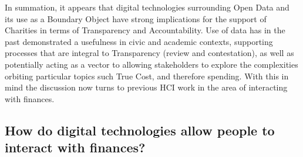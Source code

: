 In summation, it appears that digital technologies surrounding Open Data and its use as a Boundary Object have strong implications for the support of Charities in terms of Transparency and Accountability. Use of data has in the past demonstrated a usefulness in civic and academic contexts, supporting processes that are integral to Transparency (review and contestation), as well as potentially acting as a vector to allowing stakeholders to explore the complexities orbiting particular topics such True Cost, and therefore spending. With this in mind the discussion now turns to previous HCI work in the area of interacting with finances.


\subsection{How do digital technologies allow people to interact with finances?}%


